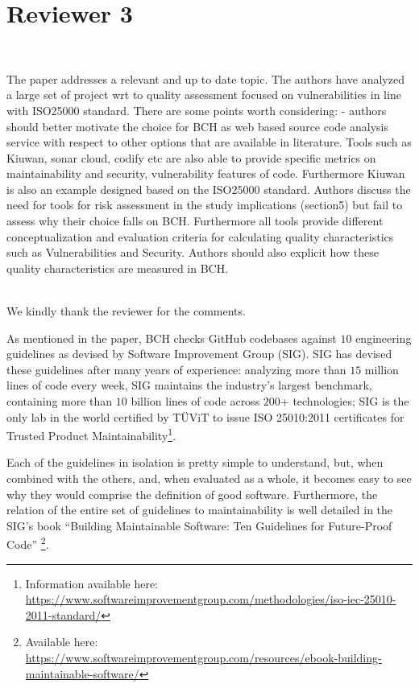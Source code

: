 \documentclass[11pt,fleqn]{article}
\newcommand{\eline}{\vspace*{.75\baselineskip}}
\newcommand{\Referee}[1]{\eline \noindent {\bf Reviewer comment #1:} \\}
\newcommand{\Us}{\eline \noindent {\bf Response:}\\}
\newcommand{\newreviewer}[1]{\section*{Reviewer #1}\vspace*{-1.05\baselineskip}}
\newenvironment{revcomment}[1][]
{\Referee{#1}\begin{rcomment}}
{\end{rcomment}}
\begin{document}
\pagebreak

\newreviewer{3}

\begin{revcomment}[3.1]

    The paper addresses a relevant and up to date topic. 
    The authors have analyzed a large set of project wrt to 
    quality assessment focused on vulnerabilities in line with 
    ISO25000 standard. There are some points worth considering: 
    - authors should better motivate the choice for BCH as web 
    based source code analysis service with respect to other 
    options that are available in literature. Tools such as Kiuwan, 
    sonar cloud, codify etc are also able to provide specific metrics 
    on maintainability and security, vulnerability features of code. 
    Furthermore Kiuwan is also an example designed based on the ISO25000 
    standard. Authors discuss the need for tools for risk assessment in 
    the study implications (section5) but fail to assess why their choice 
    falls on BCH. Furthermore all tools provide different conceptualization 
    and evaluation criteria for calculating quality characteristics such as Vulnerabilities 
    and Security. Authors should also explicit how these quality characteristics are measured in BCH. 

\end{revcomment}

\Us We kindly thank the reviewer for the comments. 

As mentioned in the paper, BCH checks GitHub codebases against $10$ engineering 
guidelines as devised by Software Improvement Group (SIG). SIG has devised 
these guidelines after many years of experience: analyzing more than $15$ million 
lines of code every week, SIG maintains the industry’s largest 
benchmark, containing more than $10$ billion lines of code across $200$+ 
technologies; SIG is the only lab in the world certified by TÜViT to issue ISO 25010:2011
certificates for Trusted Product Maintainability\footnote{Information available here: 
\url{https://www.softwareimprovementgroup.com/methodologies/iso-iec-25010-2011-standard/}}.

Each of the guidelines in isolation is pretty simple to understand, but, when 
combined with the others, and, when evaluated as a whole, it becomes easy to see why 
they would comprise the definition of good software. Furthermore, the relation of the entire set of
guidelines to maintainability is well detailed in the SIG's book ``Building Maintainable 
Software: Ten Guidelines for Future-Proof Code''
\footnote{Available here: 
\url{https://www.softwareimprovementgroup.com/resources/ebook-building-maintainable-software/}}.
\end{document}
